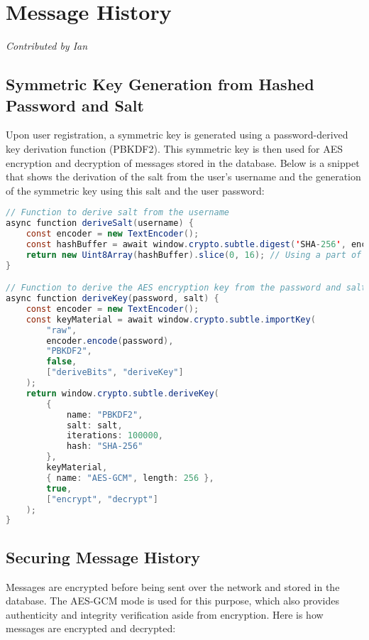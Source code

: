 \documentclass{article}
\begin{document}
\section{Message History}
\textit{Contributed by Ian}

\subsection*{Symmetric Key Generation from Hashed Password and Salt}
Upon user registration, a symmetric key is generated using a password-derived key derivation function (PBKDF2). This symmetric key is then used for AES encryption and decryption of messages stored in the database. Below is a snippet that shows the derivation of the salt from the user's username and the generation of the symmetric key using this salt and the user password:

\begin{lstlisting}[language=Java]
// Function to derive salt from the username
async function deriveSalt(username) {
    const encoder = new TextEncoder();
    const hashBuffer = await window.crypto.subtle.digest('SHA-256', encoder.encode(username));
    return new Uint8Array(hashBuffer).slice(0, 16); // Using a part of the hash as salt
}

// Function to derive the AES encryption key from the password and salt
async function deriveKey(password, salt) {
    const encoder = new TextEncoder();
    const keyMaterial = await window.crypto.subtle.importKey(
        "raw",
        encoder.encode(password),
        "PBKDF2",
        false,
        ["deriveBits", "deriveKey"]
    );
    return window.crypto.subtle.deriveKey(
        {
            name: "PBKDF2",
            salt: salt,
            iterations: 100000,
            hash: "SHA-256"
        },
        keyMaterial,
        { name: "AES-GCM", length: 256 },
        true,
        ["encrypt", "decrypt"]
    );
}
\end{lstlisting}

\subsection*{Securing Message History}
Messages are encrypted before being sent over the network and stored in the database. The AES-GCM mode is used for this purpose, which also provides authenticity and integrity verification aside from encryption. Here is how messages are encrypted and decrypted:
\end{document}
